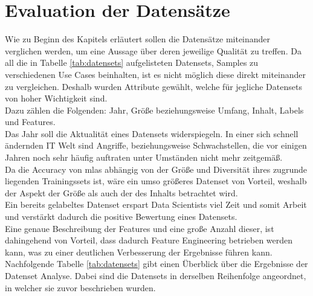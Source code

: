 \documentclass[
    12pt, %
    DIV10,
    ngerman, %
    a4paper, %
    oneside, %
    titlepage, %
    parskip=half, %
    headings=normal, %
    listof=totoc, %
    bibliography=totoc, %
    index=totoc, %
    captions=tableheading, %
    final %
]{scrreprt}
\begin{document}
\section{Evaluation der Datensätze}
Wie zu Beginn des Kapitels erläutert sollen die Datensätze miteinander verglichen werden, um eine Aussage über deren jeweilige Qualität zu treffen. Da all die in Tabelle \ref{tab:datensets} aufgelisteten Datensets, Samples zu verschiedenen Use Cases beinhalten, ist es nicht möglich diese direkt miteinander zu vergleichen. Deshalb wurden Attribute gewählt, welche für jegliche Datensets von hoher Wichtigkeit sind.\\ Dazu zählen die Folgenden: Jahr, Grö{\ss}e beziehungsweise Umfang, Inhalt, Labels und Features.\\
Das Jahr soll die Aktualität eines Datensets widerspiegeln. In einer sich schnell ändernden IT Welt sind Angriffe, beziehungsweise Schwachstellen, die vor einigen Jahren noch sehr häufig auftraten unter Umständen nicht mehr zeitgemä{\ss}.\\
Da die Accuracy von \ac{mlas} abhängig von der Grö{\ss}e und Diversität ihres zugrunde liegenden Trainingssets ist, wäre ein umso grö{\ss}eres Datenset von Vorteil, weshalb der Aspekt der Grö{\ss}e als auch der des Inhalts betrachtet wird.\\
Ein bereits gelabeltes Datenset erspart Data Scientists viel Zeit und somit Arbeit und verstärkt dadurch die positive Bewertung eines Datensets.\\
Eine genaue Beschreibung der Features und eine gro{\ss}e Anzahl dieser, ist dahingehend von Vorteil, dass dadurch Feature Engineering betrieben werden kann, was zu einer deutlichen Verbesserung der Ergebnisse führen kann.\\
Nachfolgende Tabelle \ref{tab:datensets} gibt einen Überblick über die Ergebnisse der Datenset Analyse. Dabei sind die Datensets in derselben Reihenfolge angeordnet, in welcher sie zuvor beschrieben wurden.
\end{document}
